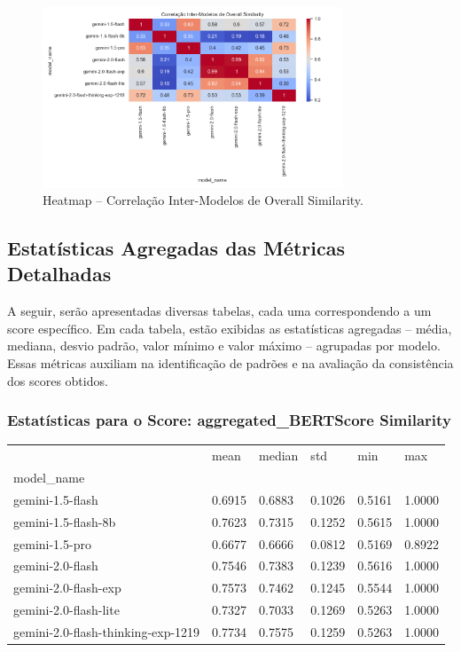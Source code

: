 \documentclass{article}%
\begin{document}
\begin{figure}[H]%
\centering%
\includegraphics[width=0.8\textwidth]{analysis_results/heatmap_inter_model_corr.png}%
\caption{Heatmap – Correlação Inter{-}Modelos de Overall Similarity.}%
\end{figure}

%
\subsection*{Estatísticas Agregadas das Métricas Detalhadas}%
\label{subsec:EstatsticasAgregadasdasMtricasDetalhadas}%
A seguir, serão apresentadas diversas tabelas, cada uma correspondendo a um score específico. Em cada tabela, estão exibidas as estatísticas agregadas – média, mediana, desvio padrão, valor mínimo e valor máximo – agrupadas por modelo. Essas métricas auxiliam na identificação de padrões e na avaliação da consistência dos scores obtidos.%
\subsubsection*{Estatísticas para o Score: aggregated\_BERTScore Similarity}%
\begin{table}[H]%
\centering%
\begin{tabular}{llllll}
\toprule
 & mean & median & std & min & max \\
model_name &  &  &  &  &  \\
\midrule
gemini-1.5-flash & 0.6915 & 0.6883 & 0.1026 & 0.5161 & 1.0000 \\
gemini-1.5-flash-8b & 0.7623 & 0.7315 & 0.1252 & 0.5615 & 1.0000 \\
gemini-1.5-pro & 0.6677 & 0.6666 & 0.0812 & 0.5169 & 0.8922 \\
gemini-2.0-flash & 0.7546 & 0.7383 & 0.1239 & 0.5616 & 1.0000 \\
gemini-2.0-flash-exp & 0.7573 & 0.7462 & 0.1245 & 0.5544 & 1.0000 \\
gemini-2.0-flash-lite & 0.7327 & 0.7033 & 0.1269 & 0.5263 & 1.0000 \\
gemini-2.0-flash-thinking-exp-1219 & 0.7734 & 0.7575 & 0.1259 & 0.5263 & 1.0000 \\
\bottomrule
\end{tabular}
%
\end{table}%
\vspace{0.5cm}%
\end{document}
